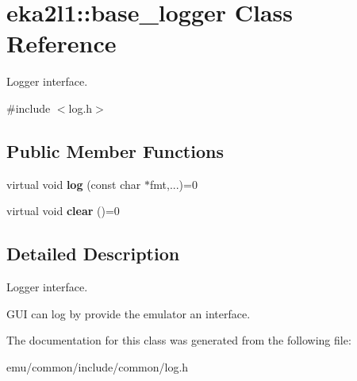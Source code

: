 \hypertarget{classeka2l1_1_1base__logger}{}\section{eka2l1\+:\+:base\+\_\+logger Class Reference}
\label{classeka2l1_1_1base__logger}


Logger interface.  




{\ttfamily \#include $<$log.\+h$>$}

\subsection*{Public Member Functions}
\begin{DoxyCompactItemize}
\item 
\mbox{\label{classeka2l1_1_1base__logger_ac1691ae02f2a1598bf2eb4087937f856}} 
virtual void {\bfseries log} (const char $\ast$fmt,...)=0
\item 
\mbox{\label{classeka2l1_1_1base__logger_ac537bc7a28be6f1c50eb830f50c80422}} 
virtual void {\bfseries clear} ()=0
\end{DoxyCompactItemize}


\subsection{Detailed Description}
Logger interface. 

G\+UI can log by provide the emulator an interface. 

The documentation for this class was generated from the following file\+:\begin{DoxyCompactItemize}
\item 
emu/common/include/common/log.\+h\end{DoxyCompactItemize}
